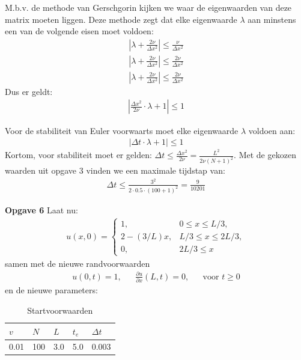 \documentclass{article}
\newcommand{\Dt}{\Delta t}
\begin{document}
M.b.v. de methode van Gerschgorin kijken we waar de eigenwaarden van deze matrix moeten liggen.
Deze methode zegt dat elke eigenwaarde $\lambda$ aan minstens een van de volgende eisen moet voldoen:
\begin{align*}
\left|\lambda + \frac{2\nu}{\Delta x^2}\right| \leq \frac{\nu}{\Delta x^2}\\
\left|\lambda + \frac{2\nu}{\Delta x^2}\right| \leq \frac{2\nu}{\Delta x^2}\\
\left|\lambda + \frac{2\nu}{\Delta x^2}\right| \leq \frac{2\nu}{\Delta x^2}
\end{align*}
Dus er geldt:
\begin{align*}
\left|\frac{\Delta x^2}{2\nu} \cdot\lambda +1\right|\leq 1
\end{align*}

Voor de stabiliteit van Euler voorwaarts moet elke eigenwaarde $\lambda$ voldoen aan:
\begin{align*}
\left|\Delta t \cdot\lambda +1\right|\leq 1
\end{align*}
Kortom, voor stabiliteit moet er gelden: $\Delta t \leq \frac{\Delta x^2}{2\nu} =\frac{L^2}{2\nu(N+1)^2}$.
Met de gekozen waarden uit opgave $3$ vinden we een maximale tijdstap van:
\begin{align*}
\Delta t \leq \frac{3^2}{2\cdot 0.5 \cdot(100 +1)^2} = \frac{9}{10201}
\end{align*}

\textbf{Opgave 6}
Laat nu: 
\begin{align*}
	u(x,0) =\begin{cases}
	1, & 0\leq x \leq L/3,\\
	2-(3/L)x, & L/3 \leq x\leq 2L/3,\\
	0, & 2L/3 \leq x
	\end{cases}
\end{align*}
samen met de nieuwe randvoorwaarden 
\begin{align*}
u(0,t)=1,&&\frac{\partial u}{\partial x}(L,t)=0,&&\mbox{voor }t\geq 0
\end{align*}
en de nieuwe parameters:
\begin{table}[H]
\centering
\label{tab:specs2}
\begin{tabular}{|l|l|l|l|l|}
\hline
\(v\) & \(N\) & \(L\) & \(t_e\) & \(\Dt\) \\ \hline
 0.01 & 100 & 3.0 & 5.0 & 0.003 \\ \hline
\end{tabular}
\caption{Startvoorwaarden}
\end{table}
\end{document}
